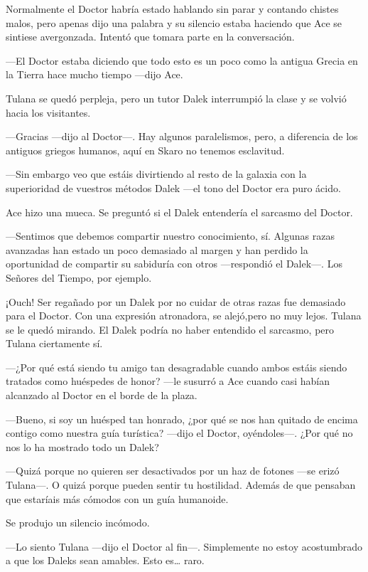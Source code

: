 Normalmente el Doctor habría estado hablando sin parar y
contando chistes malos, pero apenas dijo una palabra y su silencio
estaba haciendo que Ace se sintiese avergonzada. Intentó que tomara
parte en la conversación.

---El Doctor estaba diciendo que todo esto es un poco como la
antigua Grecia en la Tierra hace mucho tiempo ---dijo Ace.

Tulana se quedó perpleja, pero un tutor Dalek interrumpió la
clase y se volvió hacia los visitantes.

---Gracias ---dijo al Doctor---. Hay algunos paralelismos, pero,
a diferencia de los antiguos griegos humanos, aquí en Skaro no tenemos
esclavitud.

---Sin embargo veo que estáis divirtiendo al resto de la galaxia
con la superioridad de vuestros métodos Dalek ---el tono del Doctor era
puro ácido.

Ace hizo una mueca. Se preguntó si el Dalek entendería el
sarcasmo del Doctor.

---Sentimos que debemos compartir nuestro conocimiento, sí.
Algunas razas avanzadas han estado un poco demasiado al margen y han
perdido la oportunidad de compartir su sabiduría con otros ---respondió
el Dalek---. Los Señores del Tiempo, por ejemplo.

¡Ouch! Ser regañado por un Dalek por no cuidar de otras razas
fue demasiado para el Doctor. Con una expresión atronadora, se
alejó,pero no muy lejos. Tulana se le quedó mirando. El Dalek podría no
haber entendido el sarcasmo, pero Tulana ciertamente sí.

---¿Por qué está siendo tu amigo tan desagradable cuando ambos
estáis siendo tratados como huéspedes de honor? ---le susurró a Ace
cuando casi habían alcanzado al Doctor en el borde de la plaza.

---Bueno, si soy un huésped tan honrado, ¿por qué se nos han
quitado de encima contigo como nuestra guía turística? ---dijo el
Doctor, oyéndoles---. ¿Por qué no nos lo ha mostrado todo un Dalek?

---Quizá porque no quieren ser desactivados por un haz de
fotones ---se erizó Tulana---. O quizá porque pueden sentir tu
hostilidad. Además de que pensaban que estaríais más cómodos con un guía
humanoide.

Se produjo un silencio incómodo.

---Lo siento Tulana ---dijo el Doctor al fin---. Simplemente no
estoy acostumbrado a que los Daleks sean amables. Esto es\ldots{} raro.

